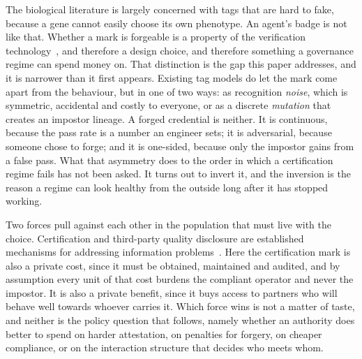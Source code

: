 \documentclass[preprint,12pt]{elsarticle}
\theoremstyle{plain}
\theoremstyle{definition}
\begin{document}
The biological literature is largely concerned with tags that are hard to fake,
because a gene cannot easily choose its own phenotype. An agent's badge is not
like that. Whether a mark is forgeable is a property of the verification
technology~\citep{jovanovic2024watermarkstealing,anbiaee2026threatmodeling}, and
therefore a design choice, and therefore something a governance regime can spend
money on. That distinction is the gap this paper addresses, and it is narrower
than it first appears. Existing tag models do let the mark come apart from the
behaviour, but in one of two ways: as recognition \emph{noise}, which is
symmetric, accidental and costly to everyone, or as a discrete \emph{mutation}
that creates an impostor lineage. A forged credential is neither. It is
continuous, because the pass rate is a number an engineer sets; it is
adversarial, because someone chose to forge; and it is one-sided, because only
the impostor gains from a false pass. What that asymmetry does to the order in
which a certification regime fails has not been asked. It turns out to invert
it, and the inversion is the reason a regime can look healthy from the outside
long after it has stopped working.

Two forces pull against each other in the population that must live with the
choice. Certification and third-party quality disclosure are established
mechanisms for addressing information problems~\citep{dranove2010quality}. Here
the certification mark is also a private cost, since it must be obtained,
maintained and audited, and by assumption every unit of that cost burdens the
compliant operator and never the impostor. It is also a private benefit, since
it buys access to partners who will behave well towards whoever carries it.
Which force wins is not a matter of taste, and neither is the policy question
that follows, namely whether an authority does better to spend on harder
attestation, on penalties for forgery, on cheaper compliance, or on the
interaction structure that decides who meets whom.
\end{document}
